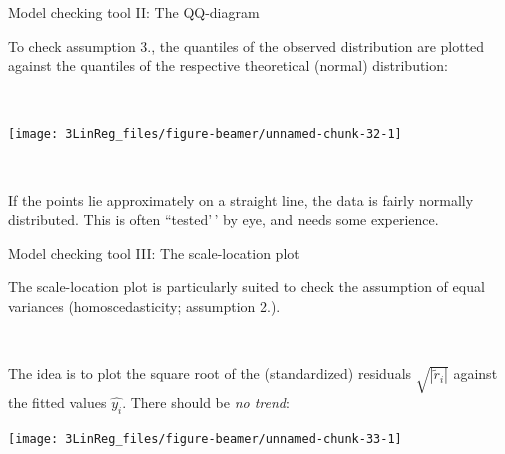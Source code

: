 \documentclass[
  10pt,
  ignorenonframetext,
]{beamer}
\begin{document}
\begin{frame}
\begin{block}{Model checking tool II: The QQ-diagram}
\protect\hypertarget{model-checking-tool-ii-the-qq-diagram}{}
\(~\)

To check assumption 3., the quantiles of the observed distribution are
plotted against the quantiles of the respective theoretical (normal)
distribution:

\(~\)

\begin{center}\texttt{[image: 3LinReg\_files/figure-beamer/unnamed-chunk-32-1]} \end{center}

\(~\)

If the points lie approximately on a straight line, the data is fairly
normally distributed. This is often ``tested'\,' by eye, and needs some
experience.
\end{block}
\end{frame}

\begin{frame}
\begin{block}{Model checking tool III: The scale-location plot}
\protect\hypertarget{model-checking-tool-iii-the-scale-location-plot}{}
\(~\)

The scale-location plot is particularly suited to check the assumption
of equal variances (homoscedasticity; assumption 2.).

\(~\)

The idea is to plot the square root of the (standardized) residuals
\(\sqrt{|\tilde{r}_i|}\) against the fitted values \(\hat{y_i}\). There
should be \emph{no trend}:

\vspace{2mm}

\begin{center}\texttt{[image: 3LinReg\_files/figure-beamer/unnamed-chunk-33-1]} \end{center}
\end{block}
\end{frame}
\end{document}
